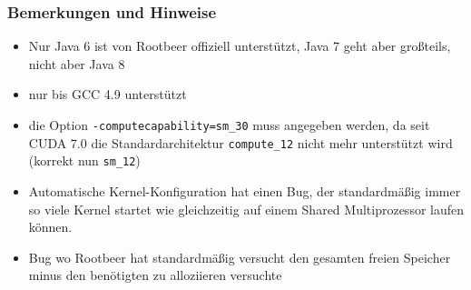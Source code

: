 \begin{frame}[fragile]
    \frametitle{Bemerkungen und Hinweise}
    \begin{itemize}
        \item Nur Java 6 ist von Rootbeer offiziell unterstützt, Java 7 geht aber großteils, nicht aber Java 8
        \item nur bis GCC 4.9 unterstützt %
        \item die Option \lstinline!-computecapability=sm_30! muss angegeben werden, da seit CUDA 7.0 die Standardarchitektur \lstinline!compute_12! nicht mehr unterstützt wird (korrekt nun \lstinline!sm_12!)
        \item Automatische Kernel-Konfiguration hat einen Bug, der standardmäßig immer so viele Kernel startet wie gleichzeitig auf einem Shared Multiprozessor laufen können.
        \item Bug wo Rootbeer hat standardmäßig versucht den gesamten freien Speicher minus den benötigten zu alloziieren versuchte

\end{itemize}
\end{frame}
